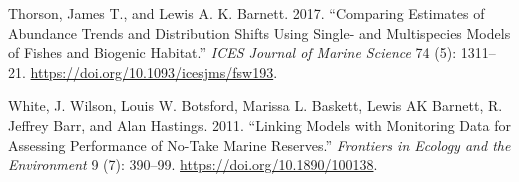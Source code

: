 \documentclass[
  default,
  lineno,
  referee]{sn-jnl}
\newlength{\cslhangindent}
\newenvironment{CSLReferences}[2] %
 {\begin{list}{}{%
  \setlength{\itemindent}{0pt}
  \setlength{\leftmargin}{0pt}
  \setlength{\parsep}{0pt}
  \ifodd #1
   \setlength{\leftmargin}{\cslhangindent}
   \setlength{\itemindent}{-1\cslhangindent}
  \fi
  \setlength{\itemsep}{#2\baselineskip}}}
 {\end{list}}
\begin{document}
\begin{CSLReferences}{1}{0}
Thorson, James T., and Lewis A. K. Barnett. 2017. {``Comparing Estimates
of Abundance Trends and Distribution Shifts Using Single- and
Multispecies Models of Fishes and Biogenic Habitat.''} \emph{ICES
Journal of Marine Science} 74 (5): 1311--21.
\url{https://doi.org/10.1093/icesjms/fsw193}.

White, J. Wilson, Louis W. Botsford, Marissa L. Baskett, Lewis AK
Barnett, R. Jeffrey Barr, and Alan Hastings. 2011. {``Linking Models
with Monitoring Data for Assessing Performance of No-Take Marine
Reserves.''} \emph{Frontiers in Ecology and the Environment} 9 (7):
390--99. \url{https://doi.org/10.1890/100138}.

\end{CSLReferences}
\end{document}
